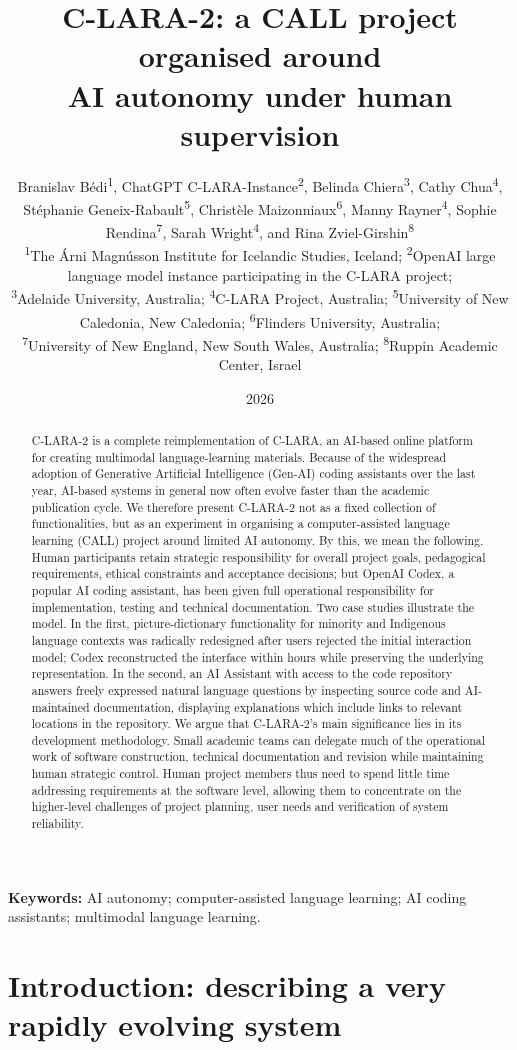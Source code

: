 \documentclass[11pt,a4paper]{article}
\title{C-LARA-2: a CALL project organised around\\AI autonomy under human supervision}
\author{%
  \parbox{0.97\textwidth}{\centering
  Branislav B\'{e}di\textsuperscript{1}, ChatGPT C-LARA-Instance\textsuperscript{2},
  Belinda Chiera\textsuperscript{3}, Cathy Chua\textsuperscript{4},
  St\'{e}phanie Geneix-Rabault\textsuperscript{5}, Christ\`{e}le Maizonniaux\textsuperscript{6},
  Manny Rayner\textsuperscript{4}, Sophie Rendina\textsuperscript{7},
  Sarah Wright\textsuperscript{4}, and Rina Zviel-Girshin\textsuperscript{8}\\[0.6em]
  \small \textsuperscript{1}The \'{A}rni Magn\'{u}sson Institute for Icelandic Studies, Iceland;
  \textsuperscript{2}OpenAI large language model instance participating in the C-LARA project;\\
  \small \textsuperscript{3}Adelaide University, Australia;
  \textsuperscript{4}C-LARA Project, Australia;
  \textsuperscript{5}University of New Caledonia, New Caledonia;
  \textsuperscript{6}Flinders University, Australia;\\
  \small \textsuperscript{7}University of New England, New South Wales, Australia;
  \textsuperscript{8}Ruppin Academic Center, Israel
  }%
}
\date{2026}
\begin{document}
\maketitle

\begin{abstract}
C-LARA-2 is a complete reimplementation of C-LARA, an AI-based online platform for creating multimodal language-learning materials. Because of the widespread adoption of Generative Artificial Intelligence (Gen-AI) coding assistants over the last year, AI-based systems in general now often evolve faster than the academic publication cycle. We therefore present C-LARA-2 not as a fixed collection of functionalities, but as an experiment in organising a computer-assisted language learning (CALL) project around limited AI autonomy. By this, we mean the following. Human participants retain strategic responsibility for overall project goals, pedagogical requirements, ethical constraints and acceptance decisions; but OpenAI Codex, a popular AI coding assistant, has been given full operational responsibility for implementation, testing and technical documentation. Two case studies illustrate the model. In the first, picture-dictionary functionality for minority and Indigenous language contexts was radically redesigned after users rejected the initial interaction model; Codex reconstructed the interface within hours while preserving the underlying representation. In the second, an AI Assistant with access to the code repository answers freely expressed natural language questions by inspecting source code and AI-maintained documentation, displaying explanations which include links to relevant locations in the repository. We argue that C-LARA-2's main significance lies in its development methodology. Small academic teams can delegate much of the operational work of software construction, technical documentation and revision while maintaining human strategic control. Human project members thus need to spend little time addressing requirements at the software level, allowing them to concentrate on the higher-level challenges of project planning, user needs and verification of system reliability.
\end{abstract}

\noindent\textbf{Keywords:} AI autonomy; computer-assisted language learning; AI coding assistants; multimodal language learning.

\section{Introduction: describing a very rapidly evolving system}
\end{document}
